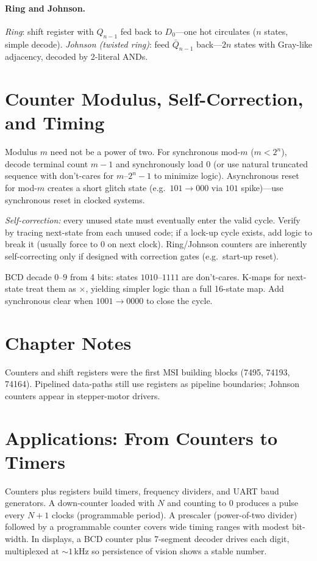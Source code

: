 \paragraph{Ring and Johnson.} \emph{Ring}: shift register with $Q_{n-1}$ fed back to $D_0$---one hot circulates ($n$ states, simple decode).
\emph{Johnson (twisted ring)}: feed $\bar Q_{n-1}$ back---$2n$ states with Gray-like adjacency, decoded by 2-literal ANDs.


\section{Counter Modulus, Self-Correction, and Timing}
Modulus $m$ need not be a power of two. For synchronous mod-$m$ ($m<2^n$), decode terminal count $m-1$ and synchronously
load $0$ (or use natural truncated sequence with don't-cares for $m$--$2^n-1$ to minimize logic). Asynchronous reset for mod-$m$
creates a short glitch state (e.g.\ $101\to000$ via $101$ spike)---use synchronous reset in clocked systems.

\emph{Self-correction:} every unused state must eventually enter the valid cycle. Verify by tracing next-state from each unused code;
if a lock-up cycle exists, add logic to break it (usually force to $0$ on next clock). Ring/Johnson counters are inherently
self-correcting only if designed with correction gates (e.g.\ start-up reset).
\begin{example}
BCD decade $0$--$9$ from 4 bits: states $1010$--$1111$ are don't-cares. K-maps for next-state treat them as $\times$,
yielding simpler logic than a full 16-state map. Add synchronous clear when $1001\to0000$ to close the cycle.
\end{example}


\section{Chapter Notes}
Counters and shift registers were the first MSI building blocks (7495, 74193, 74164).
Pipelined data-paths still use registers as pipeline boundaries; Johnson counters appear in stepper-motor drivers.

\section{Applications: From Counters to Timers}
Counters plus registers build timers, frequency dividers, and UART baud generators. A down-counter loaded with $N$ and counting to $0$
produces a pulse every $N+1$ clocks (programmable period). A prescaler (power-of-two divider) followed by a programmable counter
covers wide timing ranges with modest bit-width. In displays, a BCD counter plus 7-segment decoder drives each digit, multiplexed
at $\sim1$\,kHz so persistence of vision shows a stable number.

